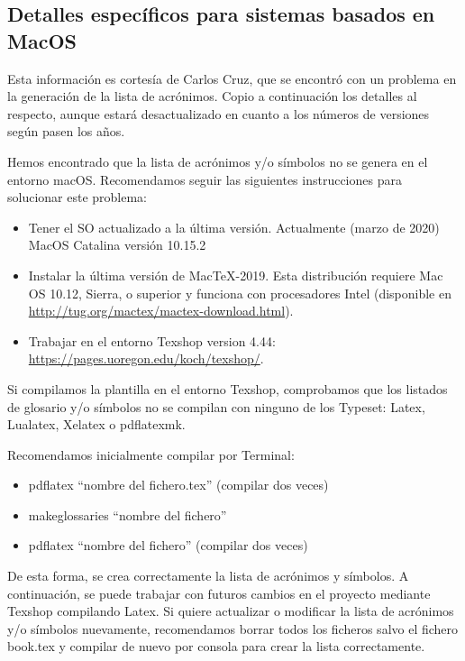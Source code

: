 \subsection{Detalles específicos para sistemas basados en MacOS}
\label{sec:detall-espec-para}

Esta información es cortesía de Carlos Cruz, que se encontró con un problema en la generación de la lista de acrónimos. Copio a continuación los detalles al respecto, aunque estará desactualizado en cuanto a los números de versiones según pasen los años.

Hemos encontrado que la lista de acrónimos y/o símbolos no se genera en el entorno macOS. Recomendamos seguir las siguientes instrucciones para solucionar este problema:

\begin{itemize}
  \item Tener el SO actualizado a la última versión. Actualmente (marzo de 2020) MacOS Catalina versión 10.15.2
  \item Instalar la última versión de MacTeX-2019. Esta distribución requiere Mac OS 10.12, Sierra, o superior y funciona con procesadores Intel (disponible en \href{http://tug.org/mactex/mactex-download.html}{http://tug.org/mactex/mactex-download.html}).
  \item Trabajar en el entorno Texshop version 4.44: \href{https://pages.uoregon.edu/koch/texshop/}{https://pages.uoregon.edu/koch/texshop/}.
\end{itemize}

Si compilamos la plantilla en el entorno Texshop, comprobamos que los listados de glosario y/o símbolos no se compilan con ninguno de los Typeset: Latex, Lualatex, Xelatex o pdflatexmk.

Recomendamos inicialmente compilar por Terminal:

\begin{itemize}
  \item pdflatex “nombre del fichero.tex” (compilar dos veces)
  \item makeglossaries “nombre del fichero”
  \item pdflatex “nombre del fichero” (compilar dos veces)
\end{itemize}

De esta forma, se crea correctamente la lista de acrónimos y símbolos. A continuación, se puede trabajar con futuros cambios en el proyecto mediante Texshop compilando Latex. Si quiere actualizar o modificar la lista de acrónimos y/o símbolos nuevamente, recomendamos borrar todos los ficheros salvo el fichero book.tex y compilar de nuevo por consola para crear la lista correctamente.



